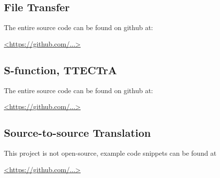 \documentclass[heading.tex]{subfiles}
\begin{document}
\newpage
\appendix

\subsection{File Transfer} \label{app:transient} 

The entire source code can be found on github at:

\url{<https://github.com/...>}

\subsection{S-function, TTECTrA}

The entire source code can be found on github at:

\url{<https://github.com/...>}

\subsection{Source-to-source Translation}

This project is not open-source, example code snippets can be found at

\url{<https://github.com/...>}

\end{document}
